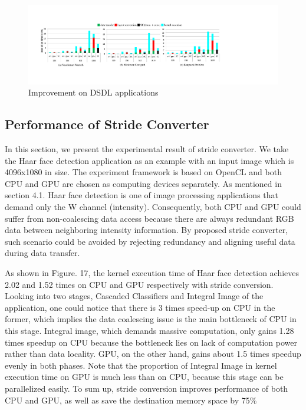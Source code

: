 \documentclass[10pt,journal,compsoc]{IEEEtran}
\begin{document}
\begin{figure}[t]
 \begin{center}
 \graphicspath{{picture/}}
 \includegraphics[scale=0.42]{Dia_experiment}
 \caption{Improvement on DSDL applications}
 \label{fig:Dia_performance}
 \end{center}
 \end{figure}


\subsection{Performance of Stride Converter}
In this section, we present the experimental result of stride converter. We take the Haar face detection application as an example with an input image which is 4096x1080 in size. The experiment framework is based on OpenCL and both CPU and GPU are chosen as computing devices separately. As mentioned in section 4.1. Haar face detection is one of image processing applications that demand only the W channel (intensity). Consequently, both CPU and GPU could suffer from non-coalescing data access because there are always redundant RGB data between neighboring intensity information. By proposed stride converter, such scenario could be avoided by rejecting redundancy and aligning useful data  during data transfer.

\indent As shown in Figure. 17, the kernel execution time of Haar face detection achieves 2.02 and 1.52 times on CPU and GPU respectively with stride conversion. Looking into two stages, Cascaded Classifiers and Integral Image of the application, one could notice that there is 3 times speed-up on CPU in the former, which implies the data coalescing issue is the main bottleneck of CPU in this stage. Integral image, which demands massive computation, only gains 1.28 times speedup on CPU because the bottleneck lies on lack of computation power rather than data locality. GPU, on the other hand, gains about 1.5 times speedup evenly in both phases. Note that the proportion of Integral Image in kernel execution time on GPU is much less than on CPU, because this stage can be parallelized easily. To sum up, stride conversion improves performance of both CPU and GPU, as well as save the destination memory space by 75\%
\end{document}
